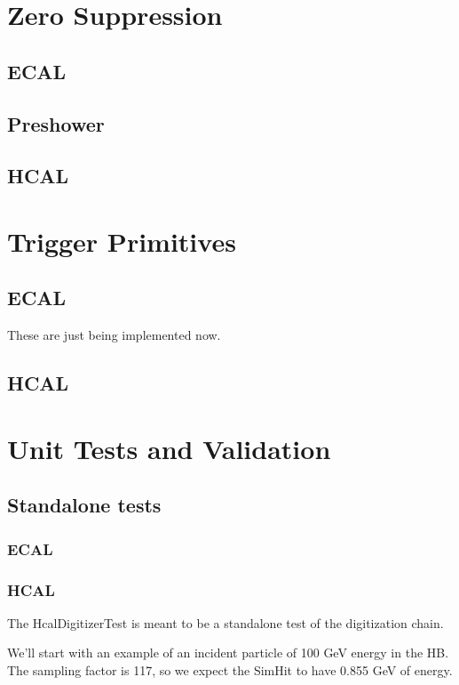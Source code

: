 \documentclass{cmspaper}
\begin{document}
\section{Zero Suppression}
\subsection{ECAL}
\subsection{Preshower}
\subsection{HCAL}

\section{Trigger Primitives}
\subsection{ECAL}

These are just being implemented now.

\subsection{HCAL}


\section{Unit Tests and Validation}

\subsection{Standalone tests}

\subsubsection{ECAL}

\subsubsection{HCAL}
The HcalDigitizerTest is meant to be a standalone
test of the digitization chain.

We'll start with an example of an incident particle of 100 GeV energy
in the HB.  The sampling factor is 117, so we expect the SimHit
to have 0.855 GeV of energy.
\end{document}

